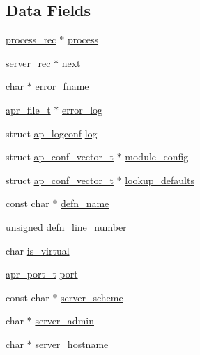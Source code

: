 \subsection*{Data Fields}
\begin{DoxyCompactItemize}
\item 
\hyperlink{structprocess__rec}{process\+\_\+rec} $\ast$ \hyperlink{structserver__rec_a3b662494b2e2b691143ffb85b1c1d658}{process}
\item 
\hyperlink{structserver__rec}{server\+\_\+rec} $\ast$ \hyperlink{structserver__rec_a8bbf4ea1c54cdba1cb7e00f9d978f540}{next}
\item 
char $\ast$ \hyperlink{structserver__rec_accf73bba23c2e5354dc9a1abdb1aa7c1}{error\+\_\+fname}
\item 
\hyperlink{structapr__file__t}{apr\+\_\+file\+\_\+t} $\ast$ \hyperlink{structserver__rec_a6b75cc308c1ea6dc45050badeaca804b}{error\+\_\+log}
\item 
struct \hyperlink{structap__logconf}{ap\+\_\+logconf} \hyperlink{structserver__rec_ad5e3b116b62837693b3149a78b95d8d9}{log}
\item 
struct \hyperlink{group__APACHE__CORE__CONFIG_ga614684670dbf748a70ac6bad272da59c}{ap\+\_\+conf\+\_\+vector\+\_\+t} $\ast$ \hyperlink{structserver__rec_ad18636e68c9070745578ebc966cfa430}{module\+\_\+config}
\item 
struct \hyperlink{group__APACHE__CORE__CONFIG_ga614684670dbf748a70ac6bad272da59c}{ap\+\_\+conf\+\_\+vector\+\_\+t} $\ast$ \hyperlink{structserver__rec_ac4527ccab39baa34ec498011896faee1}{lookup\+\_\+defaults}
\item 
const char $\ast$ \hyperlink{structserver__rec_a7d6b00ad99a16b6a7f4911a7ed895d7c}{defn\+\_\+name}
\item 
unsigned \hyperlink{structserver__rec_a58019551f088a36cd1e1d2a45f948375}{defn\+\_\+line\+\_\+number}
\item 
char \hyperlink{structserver__rec_ace39fc136327b4ab9c381ec708d93ad0}{is\+\_\+virtual}
\item 
\hyperlink{group__apr__network__io_gaa670a71960f6eb4fe0d0de2a1e7aba03}{apr\+\_\+port\+\_\+t} \hyperlink{structserver__rec_ae46ad679b7fd52db7100c96003738693}{port}
\item 
const char $\ast$ \hyperlink{structserver__rec_a78b9b80c3bc86d20ac86b7d3774da86c}{server\+\_\+scheme}
\item 
char $\ast$ \hyperlink{structserver__rec_aea2c11ad4b93b031976add937d1f6d9b}{server\+\_\+admin}
\item 
char $\ast$ \hyperlink{structserver__rec_aa4841163cff5e708d1e125ccbbd5fe35}{server\+\_\+hostname}

\end{DoxyCompactItemize}
